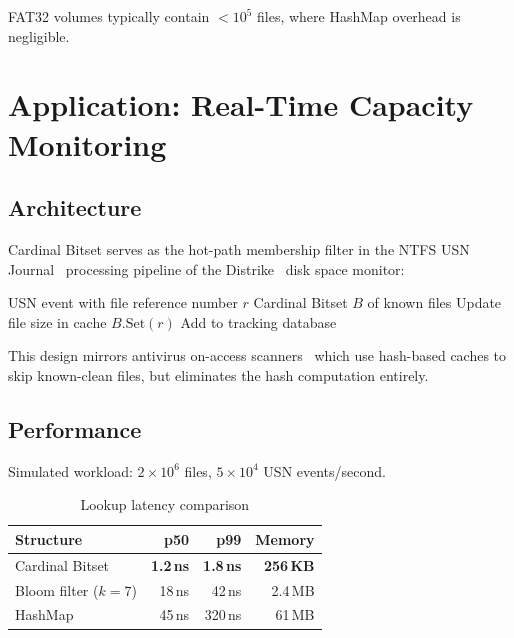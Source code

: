 \documentclass[11pt,twocolumn]{article}
\begin{document}
FAT32 volumes typically contain $< 10^5$ files, where HashMap overhead is negligible.

\section{Application: Real-Time Capacity Monitoring}

\subsection{Architecture}

Cardinal Bitset serves as the hot-path membership filter in the NTFS USN Journal~\cite{microsoft2023usn} processing pipeline of the Distrike~\cite{distrike2026} disk space monitor:

\begin{algorithm}
\caption{USN Event Classification}
\begin{algorithmic}[1]
\Require USN event with file reference number $r$
\Require Cardinal Bitset $B$ of known files
    \State Update file size in cache
\Else
    \State $B.\text{Set}(r)$
    \State Add to tracking database
\EndIf
\end{algorithmic}
\end{algorithm}

This design mirrors antivirus on-access scanners~\cite{sundarrajan2001} which use hash-based caches to skip known-clean files, but eliminates the hash computation entirely.

\subsection{Performance}

Simulated workload: $2 \times 10^6$ files, $5 \times 10^4$ USN events/second.

\begin{table}[h]
\centering
\caption{Lookup latency comparison}
\label{tab:perf}
\begin{tabular}{@{}lrrr@{}}
\toprule
Structure & p50 & p99 & Memory \\
\midrule
Cardinal Bitset & \textbf{1.2\,ns} & \textbf{1.8\,ns} & \textbf{256\,KB} \\
Bloom filter ($k\!=\!7$) & 18\,ns & 42\,ns & 2.4\,MB \\
HashMap & 45\,ns & 320\,ns & 61\,MB \\
\bottomrule
\end{tabular}
\end{table}
\end{document}
